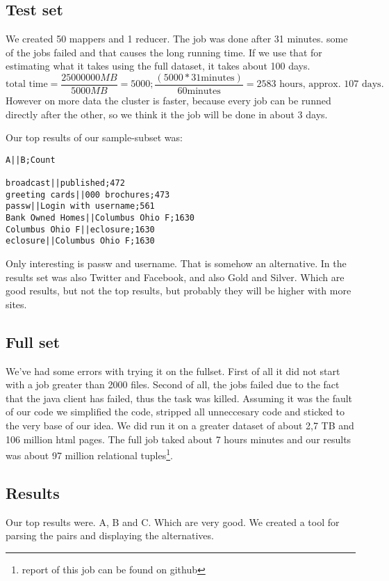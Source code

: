 \documentclass[a4paper,10pt]{article}
\begin{document}
\subsection{Test set}
We created 50 mappers and 1 reducer. The job was done after 31 minutes. some of the jobs failed and that causes the long running time. If we use that for estimating what it takes using the full dataset, it takes about 100 days. 
\begin{displaymath}
\text{total time} = \frac{25000000 MB}{5000MB} = 5000; \frac{(5000 * 31\text{minutes})}{60 \text{minutes}} = 2583 \text{ hours, approx. 107 days}. 
\end{displaymath}
However on more data the cluster is faster, because every job can be runned directly after the other, so we think it the job will be done in about 3 days. 

Our top results of our sample-subset was: 
\begin{lstlisting}[caption=Results of sample set]
A||B;Count

broadcast||published;472
greeting cards||000 brochures;473
passw||Login with username;561
Bank Owned Homes||Columbus Ohio F;1630
Columbus Ohio F||eclosure;1630
eclosure||Columbus Ohio F;1630
\end{lstlisting}

Only interesting is passw and username. That is somehow an alternative. In the results set was also Twitter and Facebook, and also Gold and Silver. Which are good results, but not the top results, but probably they will be higher with more sites. 

\subsection{Full set}
We've had some errors with trying it on the fullset. First of all it did not start with a job greater than 2000 files. Second of all, the jobs failed due to the fact that the java client has failed, thus the task was killed. Assuming it was the fault of our code we simplified the code, stripped all unneccesary code and sticked to the very base of our idea. We did run it on a greater dataset of about 2,7 TB and 106 million html pages. The full job taked about 7 hours minutes and our results was about 97 million relational tuples\footnote{report of this job can be found on github}.

\subsection{Results}
Our top results were. A, B and C. Which are very good. We created a tool for parsing the pairs and displaying the alternatives. 
\end{document}
